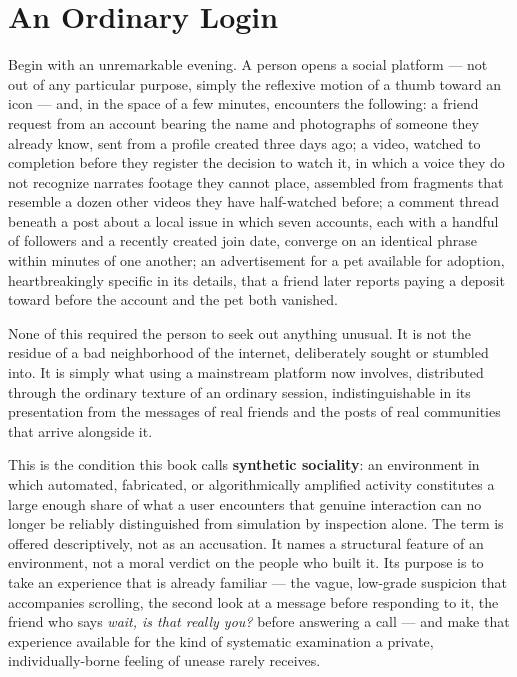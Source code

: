\documentclass[12pt,a4paper]{book}
\begin{document}
\section{An Ordinary Login}

Begin with an unremarkable evening. A person opens a social platform — not out of any particular purpose, simply the reflexive motion of a thumb toward an icon — and, in the space of a few minutes, encounters the following: a friend request from an account bearing the name and photographs of someone they already know, sent from a profile created three days ago; a video, watched to completion before they register the decision to watch it, in which a voice they do not recognize narrates footage they cannot place, assembled from fragments that resemble a dozen other videos they have half-watched before; a comment thread beneath a post about a local issue in which seven accounts, each with a handful of followers and a recently created join date, converge on an identical phrase within minutes of one another; an advertisement for a pet available for adoption, heartbreakingly specific in its details, that a friend later reports paying a deposit toward before the account and the pet both vanished.

None of this required the person to seek out anything unusual. It is not the residue of a bad neighborhood of the internet, deliberately sought or stumbled into. It is simply what using a mainstream platform now involves, distributed through the ordinary texture of an ordinary session, indistinguishable in its presentation from the messages of real friends and the posts of real communities that arrive alongside it.

This is the condition this book calls \textbf{synthetic sociality}: an environment in which automated, fabricated, or algorithmically amplified activity constitutes a large enough share of what a user encounters that genuine interaction can no longer be reliably distinguished from simulation by inspection alone. The term is offered descriptively, not as an accusation. It names a structural feature of an environment, not a moral verdict on the people who built it. Its purpose is to take an experience that is already familiar — the vague, low-grade suspicion that accompanies scrolling, the second look at a message before responding to it, the friend who says \emph{wait, is that really you?} before answering a call — and make that experience available for the kind of systematic examination a private, individually-borne feeling of unease rarely receives.
\end{document}
